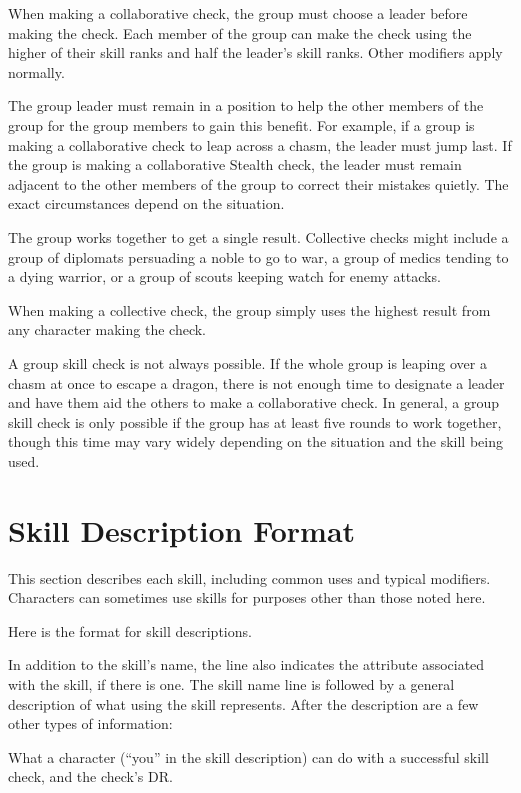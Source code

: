             When making a collaborative check, the group must choose a leader before making the check. Each member of the group can make the check using the higher of their skill ranks and half the leader's skill ranks. Other modifiers apply normally.

            The group leader must remain in a position to help the other members of the group for the group members to gain this benefit. For example, if a group is making a collaborative check to leap across a chasm, the leader must jump last. If the group is making a collaborative Stealth check, the leader must remain adjacent to the other members of the group to correct their mistakes quietly. The exact circumstances depend on the situation.

             The group works together to get a single result. Collective checks might include a group of diplomats persuading a noble to go to war, a group of medics tending to a dying warrior, or a group of scouts keeping watch for enemy attacks.

            When making a collective check, the group simply uses the highest result from any character making the check.

             A group skill check is not always possible. If the whole group is leaping over a chasm at once to escape a dragon, there is not enough time to designate a leader and have them aid the others to make a collaborative check. In general, a group skill check is only possible if the group has at least five rounds to work together, though this time may vary widely depending on the situation and the skill being used.

\section{Skill Description Format}
    This section describes each skill, including common uses and typical modifiers. Characters can sometimes use skills for purposes other than those noted here.

    Here is the format for skill descriptions.

    In addition to the skill's name, the line also indicates the attribute associated with the skill, if there is one.
    The skill name line is followed by a general description of what using the skill represents. After the description are a few other types of information:

     What a character (``you'' in the skill description) can do with a successful skill check, and the check's DR.

